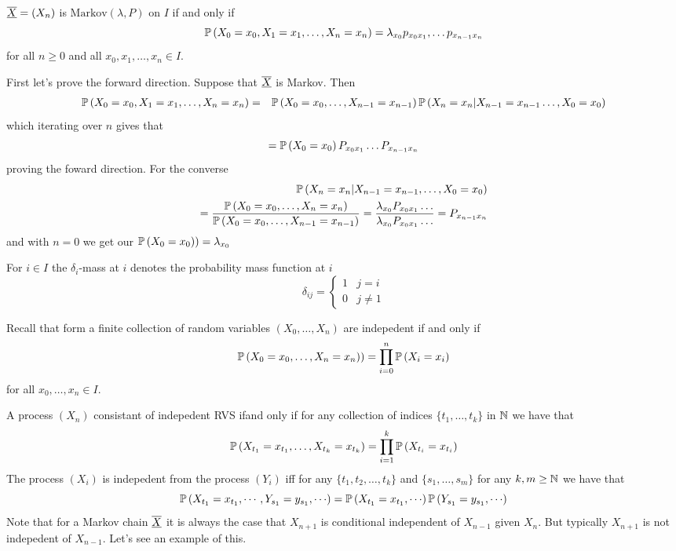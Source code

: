 \documentclass{article}
\begin{document}
\begin{theorem}
$ \underline{\overline{X}} = (X_n)$ is $ \text{Markov}(\lambda, P) $ on $ I $ if and only if
\[
\mathbb{P}\left({X_0=x_0,X_1=x_1,\dots, X_n=x_n}\right)=\lambda_{x_0}p_{x_0x_1},\dots p_{x_{n-1}x_n}
\]
for all $ n\ge 0 $ and all $ x_0,x_1,\dots, x_n\in I $.
\end{theorem} 
\pf First let's prove the forward direction. Suppose that $ \underline{\overline{X}} $ is Markov. Then \begin{align*}
  &\mathbb{P}\left({X_0=x_0,X_1=x_1,\dots,X_n=x_n}\right)
	=& \mathbb{P}\left({X_0=x_0,\dots, X_{n-1}=x_{n-1}}\right)\mathbb{P}\left({X_n=x_n|X_{n-1}=x_{n-1}\dots, X_0=x_0}\right)
\end{align*}
which iterating over $ n $ gives that
\[
	=\mathbb{P}\left({X_0=x_0}\right)P_{x_0x_1}\dots P_{x_{n-1}x_n}
\]
proving the foward direction. For the converse
\begin{align*}
	\mathbb{P}\left({X_n=x_n|X_{n-1}=x_{n-1},\dots,X_0=x_0}\right)\\
	= \frac{\mathbb{P}\left({X_0=x_0,\dots,X_n=x_n}\right)}{\mathbb{P}\left({X_0=x_0,\dots, X_{n-1}=x_{n-1}}\right)}=\frac{\lambda_{x_0}P_{x_0x_1}\dots}{\lambda_{x_0}P_{x_0x_1}\dots}=P_{x_{n-1}x_n}
\end{align*}
and with $ n=0 $ we get our $ \mathbb{P}\left({X_0=x_0)}\right)=\lambda_{x_0} $
\begin{definition}
  For $ i\in I $ the $ \delta_i $-mass at $ i $ denotes the probability mass function at $ i $ 
  \[
	  \delta_{ij}=\begin{cases}
		  1 & j=i \\
		  0 & j\ne 1
	  \end{cases}
  \]
\end{definition}
Recall that form a finite collection of random variables $ (X_0,\dots, X_n) $ are indepedent if and only if
\[
	\mathbb{P}\left({X_0=x_0,\dots, X_n=x_n)}\right)=\prod_{i=0}^n\mathbb{P}\left({X_i=x_i}\right)
\]
for all $ x_0,\dots, x_n \in I$.\par
A process $ (X_n) $ consistant of indepedent RVS ifand only if for any collection of indices $ \{t_1,\dots, t_k\} $ in $ \mathbb{N} $ we have that
\[
	\mathbb{P}\left({X_{t_1}=x_{t_1},\dots,X_{t_k}=x_{t_k}}\right)=\prod_{i=1}^k\mathbb{P}\left({X_{t_i}=x_{t_i}}\right)
\]
The process $ (X_i) $ is indepedent from the process $ (Y_i) $ iff for any $ \{t_1,t_2,\dots, t_k\} $ and $ \{s_1,\dots, s_m\} $ for any $ k,m\ge \mathbb{N} $ we have that 
\[
	\mathbb{P}\left({X_{t_1}=x_{t_1},\cdots, Y_{s_1}=y_{s_1},\cdots}\right) = \mathbb{P}\left({X_{t_1}=x_{t_1},\cdots}\right)\mathbb{P}\left({Y_{s_1}=y_{s_1},\cdots}\right)
\]
Note that for a Markov chain $ \underline{\overline{X}} $ it is always the case that $ X_{n+1} $ is conditional independent of $ X_{n-1} $ given $ X_{n} $. But typically $ X_{n+1} $ is not indepedent of $ X_{n-1} $. Let's see an example of this.
\end{document}
